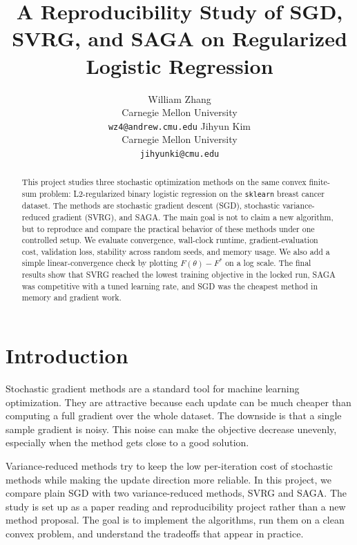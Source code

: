 \documentclass{article}
\title{A Reproducibility Study of SGD, SVRG, and SAGA on Regularized Logistic Regression}
\author{
  William Zhang \\
  Carnegie Mellon University \\
  \texttt{wz4@andrew.cmu.edu}
  \And
  Jihyun Kim \\
  Carnegie Mellon University \\
  \texttt{jihyunki@cmu.edu}
}
\begin{document}
\maketitle

\begin{abstract}
This project studies three stochastic optimization methods on the same convex
finite-sum problem: L2-regularized binary logistic regression on the
\texttt{sklearn} breast cancer dataset. The methods are stochastic gradient
descent (SGD), stochastic variance-reduced gradient (SVRG), and SAGA. The main
goal is not to claim a new algorithm, but to reproduce and compare the practical
behavior of these methods under one controlled setup. We evaluate convergence,
wall-clock runtime, gradient-evaluation cost, validation loss, stability across
random seeds, and memory usage. We also add a simple linear-convergence check by
plotting $F(\theta)-F^*$ on a log scale. The final results show that SVRG
reached the lowest training objective in the locked run, SAGA was competitive
with a tuned learning rate, and SGD was the cheapest method in memory and
gradient work.
\end{abstract}

\section{Introduction}

Stochastic gradient methods are a standard tool for machine learning
optimization. They are attractive because each update can be much cheaper than
computing a full gradient over the whole dataset. The downside is that a single
sample gradient is noisy. This noise can make the objective decrease unevenly,
especially when the method gets close to a good solution.

Variance-reduced methods try to keep the low per-iteration cost of stochastic
methods while making the update direction more reliable. In this project, we
compare plain SGD with two variance-reduced methods, SVRG and SAGA. The study is
set up as a paper reading and reproducibility project rather than a new method
proposal. The goal is to implement the algorithms, run them on a clean convex
problem, and understand the tradeoffs that appear in practice.
\end{document}
